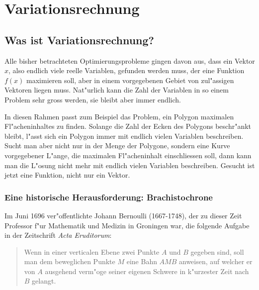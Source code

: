 \chapter{Variationsrechnung\label{chapter-variationsrechnung}}

\section{Was ist Variationsrechnung?}
\rhead{}
Alle bisher betrachteten Optimierungsprobleme gingen davon aus, dass
ein Vektor $x$, also endlich viele reelle Variablen, gefunden werden muss,
der eine Funktion $f(x)$ maximieren soll, aber in einem vorgegebenen
Gebiet von zul"assigen Vektoren liegen muss. 
Nat"urlich kann die Zahl der Variablen in so einem Problem sehr gross werden,
sie bleibt aber immer endlich.

In diesen Rahmen passt zum Beispiel das Problem, ein Polygon
maximalen Fl"acheninhaltes zu finden. Solange die Zahl der Ecken
des Polygons beschr"ankt bleibt, l"asst sich ein Polygon immer mit
endlich vielen Variablen beschreiben. Sucht man aber nicht nur in
der Menge der Polygone, sondern eine Kurve vorgegebener L"ange,
die maximalen Fl"acheninhalt einschliessen soll, dann kann man
die L"osung nicht mehr mit endlich vielen Variablen beschreiben.
Gesucht ist jetzt eine Funktion, nicht nur ein Vektor.

\subsection{Eine historische Herausforderung: Brachistochrone}
Im Juni 1696 ver"offentlichte Johann Bernoulli (1667-1748), der
zu dieser Zeit Professor f"ur Mathematik und Medizin in Groningen
war, die folgende Aufgabe in der Zeitschrift {\it Acta Eruditorum}:

\begin{quote}
Wenn in einer verticalen Ebene zwei Punkte $A$ und $B$ gegeben sind,
soll man dem beweglichen Punkte $M$ eine Bahn $AMB$ anweisen, auf welcher
er von $A$ ausgehend verm"oge seiner eigenen Schwere in k"urzester Zeit
nach $B$ gelangt.
\end{quote}

